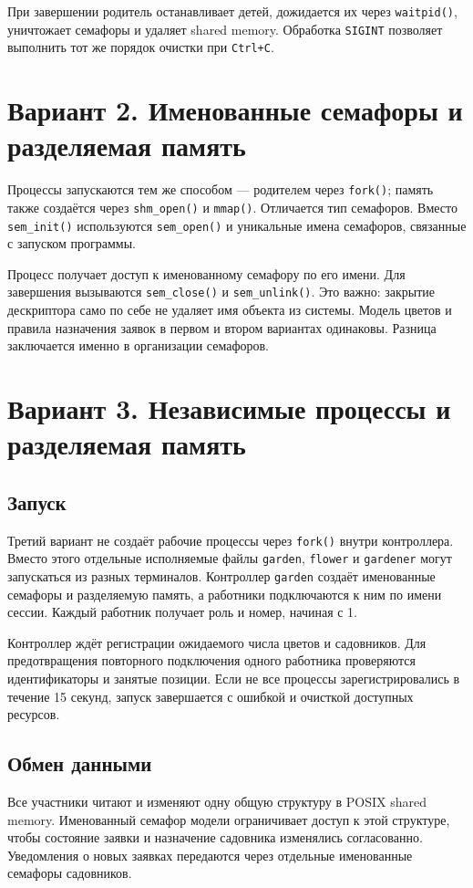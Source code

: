 \documentclass[12pt,a4paper]{article}
\begin{document}
При завершении родитель останавливает детей, дожидается их через \texttt{waitpid()}, уничтожает семафоры и удаляет shared memory. Обработка \texttt{SIGINT} позволяет выполнить тот же порядок очистки при \texttt{Ctrl+C}.

\section{Вариант 2. Именованные семафоры и разделяемая память}
Процессы запускаются тем же способом --- родителем через \texttt{fork()}; память также создаётся через \texttt{shm\_open()} и \texttt{mmap()}. Отличается тип семафоров. Вместо \texttt{sem\_init()} используются \texttt{sem\_open()} и уникальные имена семафоров, связанные с запуском программы.

Процесс получает доступ к именованному семафору по его имени. Для завершения вызываются \texttt{sem\_close()} и \texttt{sem\_unlink()}. Это важно: закрытие дескриптора само по себе не удаляет имя объекта из системы. Модель цветов и правила назначения заявок в первом и втором вариантах одинаковы. Разница заключается именно в организации семафоров.

\section{Вариант 3. Независимые процессы и разделяемая память}
\subsection{Запуск}
Третий вариант не создаёт рабочие процессы через \texttt{fork()} внутри контроллера. Вместо этого отдельные исполняемые файлы \texttt{garden}, \texttt{flower} и \texttt{gardener} могут запускаться из разных терминалов. Контроллер \texttt{garden} создаёт именованные семафоры и разделяемую память, а работники подключаются к ним по имени сессии. Каждый работник получает роль и номер, начиная с 1.

Контроллер ждёт регистрации ожидаемого числа цветов и садовников. Для предотвращения повторного подключения одного работника проверяются идентификаторы и занятые позиции. Если не все процессы зарегистрировались в течение 15 секунд, запуск завершается с ошибкой и очисткой доступных ресурсов.

\subsection{Обмен данными}
Все участники читают и изменяют одну общую структуру в POSIX shared memory. Именованный семафор модели ограничивает доступ к этой структуре, чтобы состояние заявки и назначение садовника изменялись согласованно. Уведомления о новых заявках передаются через отдельные именованные семафоры садовников.
\end{document}
